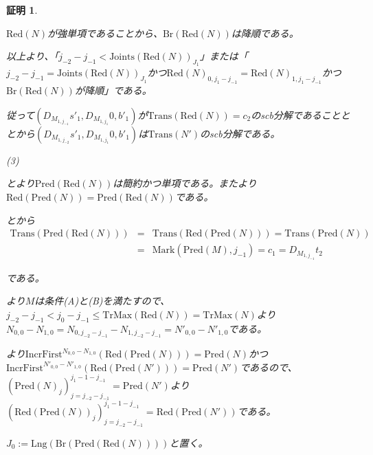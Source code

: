 \documentclass[dvipdfmx,uplatex]{jsarticle}
\theoremstyle{customnonumberbreakfortheorem}
\theoremstyle{customnonumberbreakforproof}
\newtheorem{hideableproof}{証明}
\begin{document}
\begin{hideableproof}
\begin{indented}
\begin{indented}
			\item \(\textrm{Red}(N)\)が強単項であることから、\(\textrm{Br}(\textrm{Red}(N))\)は降順である。
		\end{indented}
		\item 以上より、「\(j_{-2}-j_{-1} < \textrm{Joints}(\textrm{Red}(N))_{J_1}\)」または「\(j_{-2}-j_{-1} = \textrm{Joints}(\textrm{Red}(N))_{J_1}\)かつ\(\textrm{Red}(N)_{0,j_1-j_{-1}} = \textrm{Red}(N)_{1,j_1-j_{-1}}\)かつ\(\textrm{Br}(\textrm{Red}(N))\)が降順」である。
		\item 従って\((D_{M_{1,j_{-1}}} s'_1,D_{M_{1,j_1}} 0,b'_1)\)が\(\textrm{Trans}(\textrm{Red}(N)) = c_2\)のscb分解であることととから\((D_{M_{1,j_{-2}}} s'_1,D_{M_{1,j_1}} 0,b'_1)\)は\(\textrm{Trans}(N')\)のscb分解である。
		\item
		\item (3)
		\item {}とより\(\textrm{Pred}(\textrm{Red}(N))\)は簡約かつ単項である。またより\(\textrm{Red}(\textrm{Pred}(N)) = \textrm{Pred}(\textrm{Red}(N))\)である。
		\item {}とから
		\begin{eqnarray*}
		\textrm{Trans}(\textrm{Pred}(\textrm{Red}(N))) & = & \textrm{Trans}(\textrm{Red}(\textrm{Pred}(N))) = \textrm{Trans}(\textrm{Pred}(N)) \\
		& = & \textrm{Mark}(\textrm{Pred}(M),j_{-1}) = c_1 = D_{M_{1,j_{-1}}} t_2
		\end{eqnarray*}
		\item である。
		\item {}より\(M\)は条件(A)と(B)を満たすので、\(j_{-2}-j_{-1} < j_0-j_{-1} \leq \textrm{TrMax}(\textrm{Red}(N)) = \textrm{TrMax}(N)\)より\(N_{0,0}-N_{1,0} = N_{0,j_{-2}-j_{-1}}-N_{1,j_{-2}-j_{-1}} = N'_{0,0}-N'_{1,0}\)である。
		\item {}より\(\textrm{IncrFirst}^{N_{0,0}-N_{1,0}}(\textrm{Red}(\textrm{Pred}(N))) = \textrm{Pred}(N)\)かつ\(\textrm{IncrFirst}^{N'_{0,0}-N'_{1,0}}(\textrm{Red}(\textrm{Pred}(N'))) = \textrm{Pred}(N')\)であるので、\((\textrm{Pred}(N)_j)_{j=j_{-2}-j_{-1}}^{j_1-1-j_{-1}} = \textrm{Pred}(N')\)より\((\textrm{Red}(\textrm{Pred}(N))_j)_{j=j_{-2}-j_{-1}}^{j_1-1-j_{-1}} = \textrm{Red}(\textrm{Pred}(N'))\)である。
		\item \(J_0 := \textrm{Lng}(\textrm{Br}(\textrm{Pred}(\textrm{Red}(N))))\)と置く。

\end{indented}
\end{hideableproof}
\end{document}

